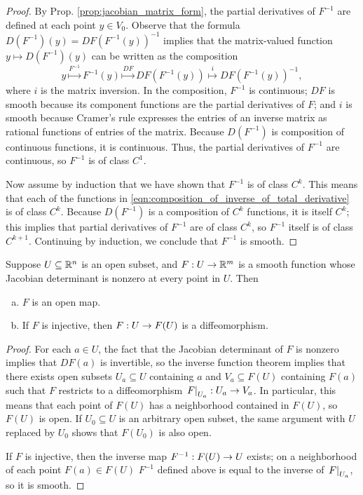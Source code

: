 \documentclass[11pt,a4paper]{article}
\begin{document}
\begin{proof}
By Prop. \ref{prop:jacobian_matrix_form}, the partial derivatives of $F^{-1}$ are defined at each point $y\in V_0$. Observe that the formula $D(F^{-1})(y) = DF(F^{-1}(y))^{-1}$ implies that the matrix-valued function $y\mapsto D(F^{-1})(y)$ can be written as the composition 
\begin{equation}\label{eqn:composition_of_inverse_of_total_derivative}
y\overset{F^{-1}}{\longmapsto} F^{-1}(y) \overset{DF}{\longmapsto} DF(F^{-1}(y)) \overset{i}{\longmapsto} DF(F^{-1}(y))^{-1},
\end{equation}
where $i$ is the matrix inversion. In the composition, $F^{-1}$ is continuous; $DF$ is smooth because its component functions are the partial derivatives of $F$; and $i$ is smooth because Cramer's rule expresses the entries of an inverse matrix as rational functions of entries of the matrix. Because $D(F^{-1})$ is composition of continuous functions, it is continuous. Thus, the partial derivatives of $F^{-1}$ are continuous, so $F^{-1}$ is of class $C^1$.

Now assume by induction that we have shown that $F^{-1}$ is of class $C^k$. This means that each of the functions in \eqref{eqn:composition_of_inverse_of_total_derivative} is of class $C^k$. Because $D(F^{-1})$ is a composition of $C^k$ functions, it is itself $C^k$; this implies that partial derivatives of $F^{-1}$ are of class $C^k$, so $F^{-1}$ itself is of class $C^{k+1}$. Continuing by induction, we conclude that $F^{-1}$ is smooth.
\end{proof}

\begin{corollary}
Suppose $U\subseteq \mathbb{R}^n$ is an open subset, and $F:U\rightarrow \mathbb{R}^m$ is a smooth function whose Jacobian determinant is nonzero at every point in $U$. Then
\begin{enumerate}[(a)]
    \item $F$ is an open map.
    \item If $F$ is injective, then $F:U\rightarrow F(U)$ is a diffeomorphism.
\end{enumerate}
\end{corollary}

\begin{proof}
 For each $a\in U$, the fact that the Jacobian determinant of $F$ is nonzero implies that $DF(a)$ is invertible, so the inverse function theorem implies that there exists open subsets $U_a\subseteq U$ containing $a$ and $V_a\subseteq F(U)$ containing $F(a)$ such that $F$ restricts to a diffeomorphism $\left.F\right|_{U_a}:U_a\rightarrow V_a$. In particular, this means that each point of $F(U)$ has a neighborhood contained in $F(U)$, so $F(U)$ is open. If $U_0\subseteq U$ is an arbitrary open subset, the same argument with $U$ replaced by $U_0$ shows that $F(U_0)$ is also open.

 If $F$ is injective, then the inverse map $F^{-1}:F(U)\rightarrow U$ exists; on a neighborhood of each point $F(a)\in F(U)$ $F^{-1}$ defined above is equal to the inverse of $\left.F\right|_{U_a}$, so it is smooth.
\end{proof}
\end{document}
